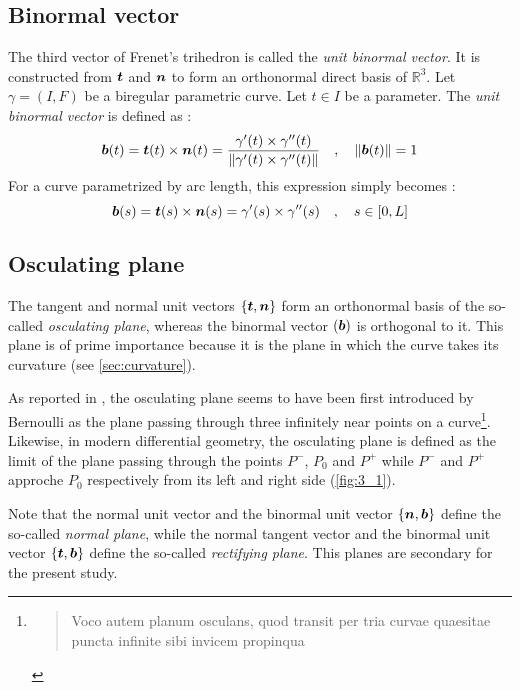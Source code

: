 \subsection{Binormal vector}
The third vector of Frenet's trihedron is called the \emph{unit binormal vector}. It is constructed from $\boldsymbol{t}$ and $\boldsymbol{n}$ to form an orthonormal direct basis of $\mathbb{R}^{3}$. 
Let $\gamma = (I,F)$ be a biregular parametric curve. Let $t \in I$ be a parameter. The \emph{unit binormal vector} is defined as :
\begin{equation}
	\boldsymbol{b}(t) = \boldsymbol{t}(t) \times \boldsymbol{n}(t)
	= \frac{\gamma'(t) \times \gamma''(t)}{\lVert\gamma'(t) \times \gamma''(t)\rVert}
	\quad,\quad
	\lVert\boldsymbol{b}(t)\rVert=1
\end{equation}
For a curve parametrized by arc length, this expression simply becomes :
\begin{equation}
	\boldsymbol{b}(s) = \boldsymbol{t}(s) \times \boldsymbol{n}(s)
	= \gamma'(s) \times \gamma''(s)
	\quad,\quad
	s \in [0,L]
\end{equation}

\subsection{Osculating plane}\label{sec:osculatingplane}
The tangent and normal unit vectors $\{\boldsymbol{t},\boldsymbol{n}\}$ form an orthonormal basis of the so-called \emph{osculating plane}, whereas the binormal vector $(\boldsymbol{b})$ is orthogonal to it. This plane is of prime importance because it is the plane in which the curve takes its curvature (see \cref{sec:curvature}).

As reported in \cite[p.45]{Delcourt2007}, the osculating plane seems to have been first introduced by Bernoulli as the plane passing through three infinitely near points on a curve\footnote{
\blockcquote[p.113]{Bernoulli1728}{Voco autem planum osculans, quod transit per tria curvae quaesitae puncta infinite sibi invicem propinqua}.
}. Likewise, in modern differential geometry, the osculating plane is defined as the limit of the plane passing through the points $P^-$, $P_0$ and $P^+$ while $P^-$ and $P^+$ approche $P_0$ respectively from its left and right side (\cref{fig:3_1}).

Note that the normal unit vector and the binormal unit vector $\{\boldsymbol{n},\boldsymbol{b}\}$ define the so-called \emph{normal plane}, while the normal tangent vector and the binormal unit vector $\{\boldsymbol{t},\boldsymbol{b}\}$ define the so-called \emph{rectifying plane}. This planes are secondary for the present study.

